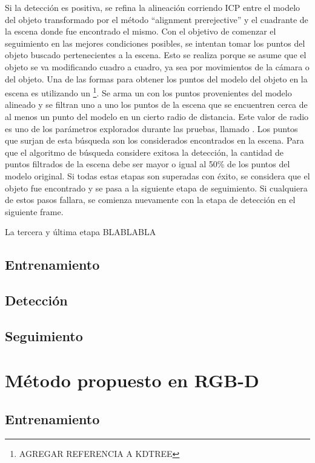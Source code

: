 Si la detección es positiva, se refina la alineación corriendo ICP entre el modelo del objeto transformado por el método ``alignment prerejective'' y el cuadrante de la escena donde fue encontrado el mismo. Con el objetivo de comenzar el seguimiento en las mejores condiciones posibles, se intentan tomar los puntos del objeto buscado pertenecientes a la escena. Esto se realiza porque se asume que el objeto se va modificando cuadro a cuadro, ya sea por movimientos de la cámara o del objeto. Una de las formas para obtener los puntos del modelo del objeto en la escena es utilizando un \kdt\footnote{AGREGAR REFERENCIA A KDTREE}.  Se arma un \kdt con los puntos provenientes del modelo alineado y se filtran uno a uno los puntos de la escena que se encuentren cerca de al menos un punto del modelo en un cierto radio de distancia. Este valor de radio es uno de los parámetros explorados durante las pruebas, llamado . Los puntos que surjan de esta búsqueda son los considerados encontrados en la escena. Para que el algoritmo de búsqueda considere exitosa la detección, la cantidad de puntos filtrados de la escena debe ser mayor o igual al 50\% de los puntos del modelo original. Si todas estas etapas son superadas con éxito, se considera que el objeto fue encontrado y se pasa a la siguiente etapa de seguimiento. Si cualquiera de estos pasos fallara, se comienza nuevamente con la etapa de detección en el siguiente frame.

La tercera y última etapa BLABLABLA

\subsection{Entrenamiento}

\subsection{Detección}


\subsection{Seguimiento}

\section{Método propuesto en RGB-D}\label{metodo_rgbd}

\subsection{Entrenamiento}


